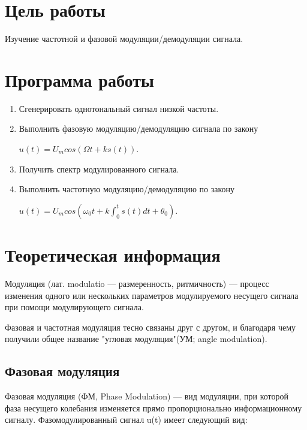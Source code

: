 
\usepackage{minted}




\setcounter{page}{2}



\section{Цель работы}
Изучение частотной и фазовой модуляции/демодуляции сигнала.

\section{Программа работы}
\begin{enumerate}
	\item Сгенерировать однотональный сигнал низкой частоты.
	\item Выполнить фазовую модуляцию/демодуляцию сигнала по закону
	
	$ u(t) = U_m cos(\Omega t + k s(t)) $.
	\item Получить спектр модулированного сигнала.
	\item Выполнить частотную модуляцию/демодуляцию по закону 
	
	$ u(t) = U_m cos (\omega_0 t + k \int_{0}^{t} s(t) dt + \theta_0) $.
	
\end{enumerate}

\section{Теоретическая информация}
Модуляция (лат. modulatio — размеренность, ритмичность) — процесс изменения одного или нескольких параметров модулируемого несущего сигнала при помощи модулирующего сигнала.

Фазовая и частотная модуляция тесно связаны друг с другом, и благодаря чему получили общее название "угловая модуляция"(УМ; angle modulation).

\subsection{Фазовая модуляция}
Фазовая модуляция (ФМ, Phase Modulation) — вид модуляции, при которой фаза несущего колебания изменяется прямо пропорционально информационному сигналу. Фазомодулированный сигнал u(t) имеет следующий вид:

